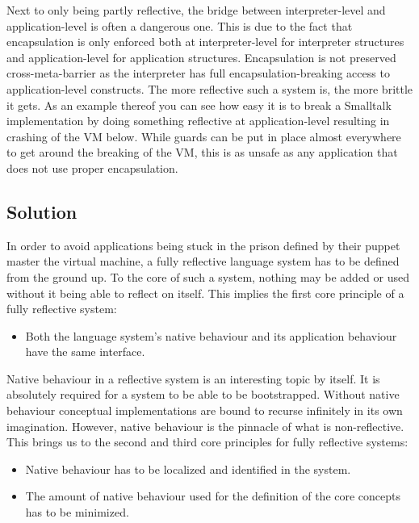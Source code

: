 \documentclass{article}
\begin{document}
Next to only being partly reflective, the bridge between interpreter-level and
application-level is often a dangerous one. This is due to the fact that 
encapsulation is only enforced both at interpreter-level for interpreter
structures and application-level for application structures. Encapsulation is
not preserved cross-meta-barrier as the interpreter has full
encapsulation-breaking access to application-level constructs. The more
reflective such a system is, the more brittle it gets. As an example thereof
you can see how easy it is to break a Smalltalk implementation by doing
something reflective at application-level resulting in crashing of the VM
below. While guards can be put in place almost everywhere to get around the
breaking of the VM, this is as unsafe as any application that does not use
proper encapsulation.

\subsection{Solution}
In order to avoid applications being stuck in the prison defined by
their puppet master the virtual machine, a fully reflective language
system has to be defined from the ground up. To the core of such a
system, nothing may be added or used without it being able to reflect
on itself. This implies the first core principle of a fully reflective
system:

\begin{itemize}
    \item Both the language system's native behaviour and its
          application behaviour have the same interface.
\end{itemize}

Native behaviour in a reflective system is an interesting topic by
itself. It is absolutely required for a system to be able to be
bootstrapped. Without native behaviour conceptual implementations
are bound to recurse infinitely in its own imagination. However,
native behaviour is the pinnacle of what is non-reflective. This
brings us to the second and third core principles for fully
reflective systems:

\begin{itemize}
    \item Native behaviour has to be localized and identified in the
          system.
    \item The amount of native behaviour used for the definition of
          the core concepts has to be minimized.
\end{itemize}
\end{document}
